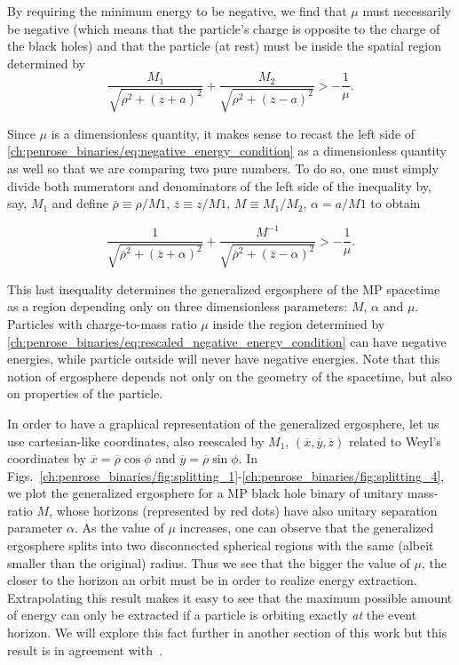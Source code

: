 By requiring the minimum energy to be negative, we find that $\mu$ must necessarily be negative (which means that the particle's charge is opposite to the charge of the black holes) and that the particle (at rest) must be inside the spatial region determined by
\begin{equation} \label{ch:penrose_binaries/eq:negative_energy_condition}
    \frac{M_1}{\sqrt{\rho^2 + (z+a)^2}} + \frac{M_2}{\sqrt{\rho^2 + (z-a)^2}} > - \frac{1}{\mu}.
\end{equation}

Since $\mu$ is a dimensionless quantity, it makes sense to recast the left side of \eqref{ch:penrose_binaries/eq:negative_energy_condition} as a dimensionless quantity as well so that we are comparing two pure numbers. To do so, one must simply divide both numerators and denominators of the left side of the inequality by, say, $M_1$ and define $\overline{\rho} \equiv \rho/M1$, $\overline{z} \equiv z/M1$, $M \equiv M_1/M_2$, $\alpha = a/M1$ to obtain

\begin{equation} \label{ch:penrose_binaries/eq:rescaled_negative_energy_condition}
    \frac{1}{\sqrt{\overline{\rho}^2 + (\overline{z}+\alpha)^2}} + \frac{M^{-1}}{\sqrt{\overline{\rho}^2 + (\overline{z}-\alpha)^2}} > - \frac{1}{\mu}.
\end{equation}

This last inequality determines the generalized ergosphere of the MP spacetime as a region depending only on three dimensionless parameters: $M$, $\alpha$ and $\mu$. Particles with charge-to-mass ratio $\mu$ inside the region determined by \eqref{ch:penrose_binaries/eq:rescaled_negative_energy_condition} can have negative energies, while particle outside will never have negative energies. Note that this notion of ergosphere depends not only on the geometry of the spacetime, but also on properties of the particle.

In order to have a graphical representation of the generalized ergosphere, let us use cartesian-like coordinates, also reescaled by $M_1$, $(\overline{x},\overline{y},\overline{z})$ related to Weyl's coordinates by $\overline{x}=\overline{\rho} \cos \phi$ and $\overline{y}=\overline{\rho} \sin \phi$. In Figs.~\ref{ch:penrose_binaries/fig:splitting_1}-\ref{ch:penrose_binaries/fig:splitting_4}, we plot the generalized ergosphere for a MP black hole binary of unitary mass-ratio $M$, whose horizons (represented by red dots) have also unitary separation parameter $\alpha$. As the value of $\mu$ increases, one can observe that the generalized ergosphere splits into two disconnected spherical regions with the same (albeit smaller than the original) radius. Thus we see that the bigger the value of $\mu$, the closer to the horizon an orbit must be in order to realize energy extraction. Extrapolating this result makes it easy to see that the maximum possible amount of energy can only be extracted if a particle is orbiting exactly \emph{at} the event horizon. We will explore this fact further in another section of this work but this result is in agreement with~\cite{RUFFINI1971}.

